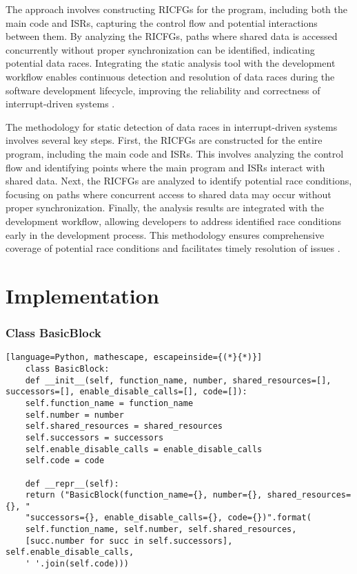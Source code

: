\documentclass[
fancyheadings, %
%
%
]{stsreprt}
\begin{document}
{The approach involves constructing RICFGs for the program, including both the main code and ISRs, capturing the control flow and potential interactions between them. By analyzing the RICFGs, paths where shared data is accessed concurrently without proper synchronization can be identified, indicating potential data races. Integrating the static analysis tool with the development workflow enables continuous detection and resolution of data races during the software development lifecycle, improving the reliability and correctness of interrupt-driven systems \cite{wang2020}.

The methodology for static detection of data races in interrupt-driven systems involves several key steps. First, the RICFGs are constructed for the entire program, including the main code and ISRs. This involves analyzing the control flow and identifying points where the main program and ISRs interact with shared data. Next, the RICFGs are analyzed to identify potential race conditions, focusing on paths where concurrent access to shared data may occur without proper synchronization. Finally, the analysis results are integrated with the development workflow, allowing developers to address identified race conditions early in the development process. This methodology ensures comprehensive coverage of potential race conditions and facilitates timely resolution of issues \cite{wang2020}.





\chapter{Implementation}
\subsection*{Class BasicBlock}

\begin{lstlisting}[language=Python, mathescape, escapeinside={(*}{*)}]
	class BasicBlock:
	def __init__(self, function_name, number, shared_resources=[], successors=[], enable_disable_calls=[], code=[]):
	self.function_name = function_name
	self.number = number
	self.shared_resources = shared_resources
	self.successors = successors
	self.enable_disable_calls = enable_disable_calls
	self.code = code
	
	def __repr__(self):
	return ("BasicBlock(function_name={}, number={}, shared_resources={}, "
	"successors={}, enable_disable_calls={}, code={})".format(
	self.function_name, self.number, self.shared_resources, 
	[succ.number for succ in self.successors], self.enable_disable_calls, 
	' '.join(self.code)))
\end{lstlisting}

}
\end{document}
